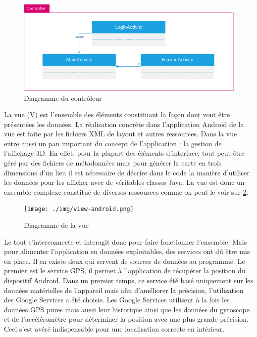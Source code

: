 \begin{figure}
    \centering
    \includegraphics{./img/android-controller.png}
    \caption{Diagramme du contrôleur}
    \label{controller}
\end{figure}


La vue (V) est l’ensemble des éléments constituant la façon dont vont être présentées les données. La réalisation concrète dans l’application Android de la vue est faite par les fichiers XML de layout et autres ressources. Dans la vue entre aussi un pan important du concept de l’application : la gestion de l’affichage 3D. En effet, pour la plupart des éléments d’interface, tout peut être géré par des fichiers de métadonnées mais pour générer la carte en trois dimensions d’un lieu il est nécessaire de décrire dans le code la manière d’utiliser les données pour les afficher avec de véritables classes Java. La vue est donc un ensemble complexe constitué de diverses ressources comme on peut le voir sur \ref{view}.

\begin{figure}
    \centering
    \texttt{[image: ./img/view-android.png]}
    \caption{Diagramme de la vue}
    \label{view}
\end{figure}

Le tout s’interconnecte et interagit donc pour faire fonctionner l’ensemble. Mais pour alimenter l’application en données exploitables, des services ont dû être mis en place. Il en existe deux qui servent de sources de données au programme. Le premier est le service GPS, il permet à l’application de récupérer la position du dispositif Android. Dans un premier temps, ce service été basé uniquement sur les données matérielles de l’appareil mais afin d’améliorer la précision, l’utilisation des Google Services a été choisie. Les Google Services utilisent à la fois les données GPS pures mais aussi leur historique ainsi que les données du gyroscope et de l’accéléromètre pour déterminer la position avec une plus grande précision. Ceci s’est avéré indispensable pour une localisation correcte en intérieur.


